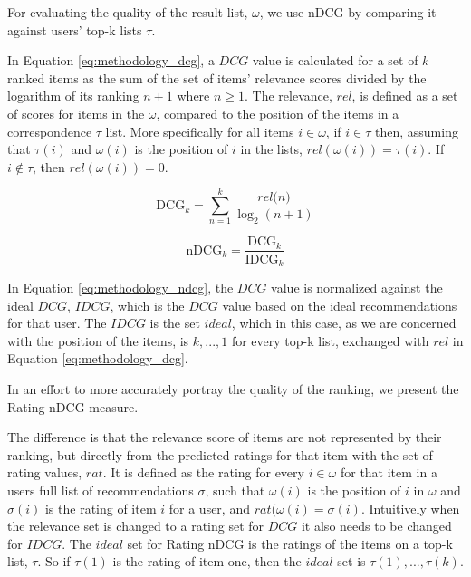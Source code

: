 \label{sec:methodology_ndcg}
For evaluating the quality of the result list, $\omega$, we use nDCG by comparing it against users' top-k lists $\tau$. 

In Equation \ref{eq:methodology_dcg}, a $DCG$ value is calculated for a set of $k$ ranked items as the sum of the set of items' relevance scores divided by the logarithm of its ranking $n + 1$ where $n \geq 1$. The relevance, $rel$, is defined as a set of scores for items in the $\omega$, compared to the position of the items in a correspondence $\tau$ list. More specifically for all items $i \in \omega$, if $i \in \tau$ then, assuming that $\tau(i)$ and $\omega(i)$ is the position of $i$ in the lists, $rel(\omega(i)) = \tau(i)$. If $i \notin \tau$, then $rel(\omega(i)) = 0$.


\begin{equation}\label{eq:methodology_dcg}
\text{DCG}_k = \sum_{n=1}^{k}\frac{\textit{rel(n)}}{\log_2(n + 1)}
\end{equation}




\begin{equation}\label{eq:methodology_ndcg}
\text{nDCG}_k = \frac{\text{DCG}_k}{\text{IDCG}_k}
\end{equation}

In Equation \ref{eq:methodology_ndcg}, the $DCG$ value is normalized against the ideal $DCG$, $IDCG$, which is the $DCG$ value based on the ideal recommendations for that user. The $IDCG$ is the set $ideal$, which in this case, as we are concerned with the position of the items, is $k,...,1$ for every top-k list, exchanged with $rel$ in Equation \ref{eq:methodology_dcg}. 

In an effort to more accurately portray the quality of the ranking, we present the Rating nDCG measure.

The difference is that the relevance score of items are not represented by their ranking, but directly from the predicted ratings for that item with the set of rating values, $rat$. It is defined as the rating for every $i\in \omega$ for that item in a users full list of recommendations $\sigma$, such that $\omega(i)$ is the position of $i$ in $\omega$ and $\sigma(i)$ is the rating of item $i$ for a user, and $rat(\omega(i) = \sigma(i)$.
Intuitively when the relevance set is changed to a rating set for $DCG$ it also needs to be changed for $IDCG$. The $ideal$ set for Rating nDCG is the ratings of the items on a top-k list, $\tau$. So if $\tau(1)$ is the rating of item one, then the $ideal$ set is $\tau(1),...,\tau(k)$.

